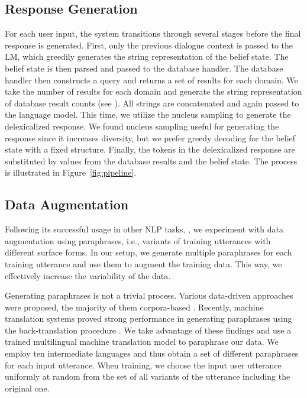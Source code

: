 \documentclass[11pt,a4paper]{article}
\begin{document}
\subsection{Response Generation}
For each user input, the system transitions through several stages before the final response is generated. First, only the previous dialogue context is passed to the LM, which greedily generates the string representation of the belief state. The belief state is then parsed and passed to the database handler. The database handler then constructs a query and returns a set of results for each domain. We take the number of results for each domain and generate the string representation of database result counts (see ). All strings are concatenated and again passed to the language model. This time, we utilize the nucleus sampling \cite{holtzman2019} to generate the delexicalized response. We found nucleus sampling useful for generating the response since it increases diversity, but we prefer greedy decoding for the belief state with a fixed structure. Finally, the tokens in the delexicalized response are substituted by values from the database results and the belief state. The process is illustrated in Figure~\ref{fig:pipeline}.

\subsection{Data Augmentation}
Following its successful usage in other NLP tasks, \cite{konstas_neural_2017,elder_shape_2020}, we experiment with data augmentation using paraphrases, i.e., variants of training utterances with different surface forms.
In our setup, we generate multiple paraphrases for each training utterance and use them to augment the training data.
This way, we effectively increase the variability of the data.

Generating paraphrases is not a trivial process.
Various data-driven approaches were proposed, the majority of them corpora-based \cite{madnani2010generating}.
Recently, machine translation systems proved strong performance in generating paraphrases using the back-translation procedure \cite{sennrich2016,edunov2018,federmann2019multilingual}.
We take advantage of these findings and use a trained multilingual machine translation model \cite{machavcek2020elitr,edunov2018} to paraphrase our data.
We employ ten intermediate languages and thus obtain a set of different paraphrases for each input utterance.
When training, we choose the input user utterance uniformly at random from the set of all variants of the utterance including the original one.
\end{document}
